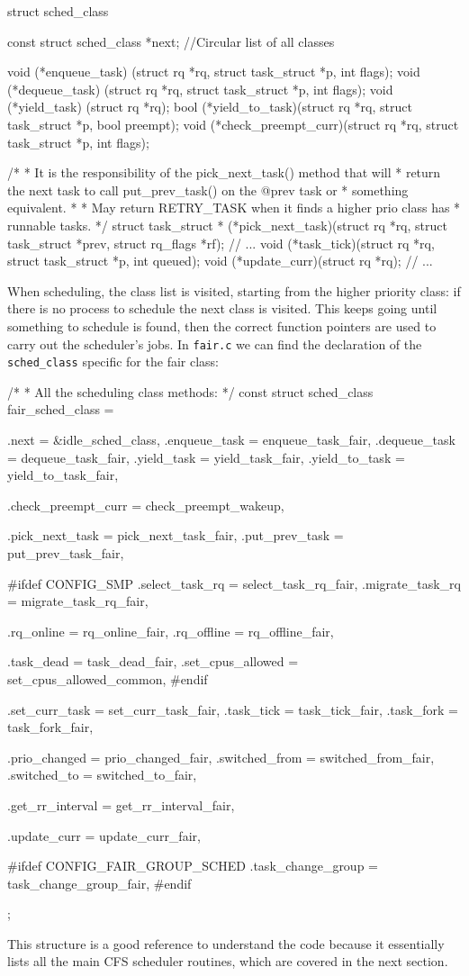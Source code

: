 \begin{code}
struct sched_class {
	const struct sched_class *next; //Circular list of all classes

	void (*enqueue_task) (struct rq *rq, struct task_struct *p, int flags);
	void (*dequeue_task) (struct rq *rq, struct task_struct *p, int flags);
	void (*yield_task)   (struct rq *rq);
	bool (*yield_to_task)(struct rq *rq, struct task_struct *p, bool preempt);
	void (*check_preempt_curr)(struct rq *rq, struct task_struct *p, int flags);

	/*
	 * It is the responsibility of the pick_next_task() method that will
	 * return the next task to call put_prev_task() on the @prev task or
	 * something equivalent.
	 *
	 * May return RETRY_TASK when it finds a higher prio class has 
	 * runnable tasks.
	 */
	struct task_struct * (*pick_next_task)(struct rq *rq,
					       struct task_struct *prev,
					       struct rq_flags *rf);
    // ...
    void (*task_tick)(struct rq *rq, struct task_struct *p, int queued);
    void (*update_curr)(struct rq *rq);
    // ...
}
\end{code}
When scheduling, the class list is visited, starting from the higher priority class: if there is no process to schedule the next class is visited. This keeps going until something to schedule is found, then the correct function pointers are used to carry out the scheduler's jobs. In \verb|fair.c| we can find the declaration of the \verb|sched_class| specific for the fair class:
\begin{code}
/*
 * All the scheduling class methods:
 */
const struct sched_class fair_sched_class = {
	.next			= &idle_sched_class,
	.enqueue_task		= enqueue_task_fair,
	.dequeue_task		= dequeue_task_fair,
	.yield_task		= yield_task_fair,
	.yield_to_task		= yield_to_task_fair,

	.check_preempt_curr	= check_preempt_wakeup,

	.pick_next_task		= pick_next_task_fair,
	.put_prev_task		= put_prev_task_fair,

#ifdef CONFIG_SMP
	.select_task_rq		= select_task_rq_fair,
	.migrate_task_rq	= migrate_task_rq_fair,

	.rq_online		= rq_online_fair,
	.rq_offline		= rq_offline_fair,

	.task_dead		= task_dead_fair,
	.set_cpus_allowed	= set_cpus_allowed_common,
#endif

	.set_curr_task          = set_curr_task_fair,
	.task_tick		= task_tick_fair,
	.task_fork		= task_fork_fair,

	.prio_changed		= prio_changed_fair,
	.switched_from		= switched_from_fair,
	.switched_to		= switched_to_fair,

	.get_rr_interval	= get_rr_interval_fair,

	.update_curr		= update_curr_fair,

#ifdef CONFIG_FAIR_GROUP_SCHED
	.task_change_group	= task_change_group_fair,
#endif
};
\end{code}
This structure is a good reference to understand the code because it essentially lists all the main CFS scheduler routines, which are covered in the next section. 

